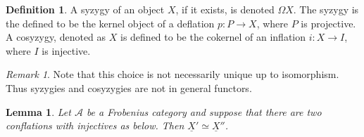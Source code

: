 \documentclass[12pt]{article}
\newtheorem{lemma}[theorem]{Lemma}
\theoremstyle{definition}
\newtheorem{definition}{Definition}[section]
\theoremstyle{remark}
\newtheorem*{remark}{Remark}
\newcommand{\upside}[1]{\rotatebox[origin=c]{180}{#1}}
\begin{document}
            \begin{definition}
                A syzygy of an object $X$, if it exists, is denoted $\Omega X$. The syzygy is the defined to be the kernel object of a deflation $p:P\rightarrow X$, where $P$ is projective. A cosyzygy, denoted as \upside{$\Omega$}$X$ is defined to be the cokernel of an inflation $i:X\rightarrow I$, where $I$ is injective.
            \end{definition}

            \begin{remark}
                Note that this choice is not necessarily unique up to isomorphism. Thus syzygies and cosyzygies are not in general functors.
            \end{remark}

            \begin{lemma}
                Let $\mathcal{A}$ be a Frobenius category and suppose that there are two conflations with injectives as below. Then $\underline{X}'\simeq\underline{X}''$.
                \begin{center}
                \end{center}
            \end{lemma}
\end{document}
